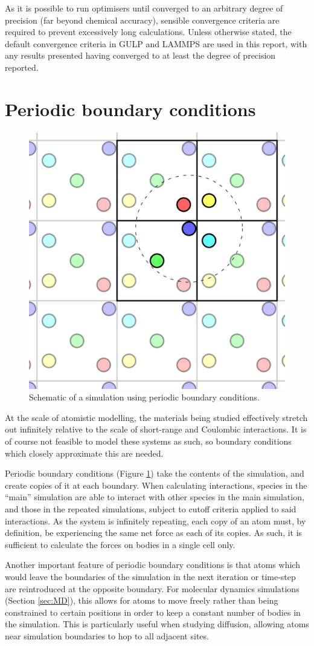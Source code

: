 As it is possible to run optimisers until converged to an arbitrary degree of precision (far beyond chemical accuracy), sensible convergence criteria are required to prevent excessively long calculations.
Unless otherwise stated, the default convergence criteria in GULP and LAMMPS are used in this report, with any results presented having converged to at least the degree of precision reported.

\newpage
\section{Periodic boundary conditions}
\begin{figure}[hb]
  \centering
  \includegraphics[width = 0.4\linewidth]{figures/pbc/pbc}
  \caption[Periodic boundary conditions schematic]{Schematic of a simulation using periodic boundary conditions.}
  \label{fig:periodic}
\end{figure}
At the scale of atomistic modelling, the materials being studied effectively stretch out infinitely relative to the scale of short-range and Coulombic interactions.
It is of course not feasible to model these systems as such, so boundary conditions which closely approximate this are needed.

Periodic boundary conditions (Figure \ref{fig:periodic}) take the contents of the simulation, and create copies of it at each boundary.
When calculating interactions, species in the ``main'' simulation are able to interact with other species in the main simulation, and those in the repeated simulations, subject to cutoff criteria applied to said interactions.
As the system is infinitely repeating, each copy of an atom must, by definition, be experiencing the same net force as each of its copies.
As such, it is sufficient to calculate the forces on bodies in a single cell only.

Another important feature of periodic boundary conditions is that atoms which would leave the boundaries of the simulation in the next iteration or time-step are reintroduced at the opposite boundary.
For molecular dynamics simulations (Section \ref{sec:MD}), this allows for atoms to move freely rather than being constrained to certain positions in order to keep a constant number of bodies in the simulation.
This is particularly useful when studying diffusion, allowing atoms near simulation boundaries to hop to all adjacent sites.


